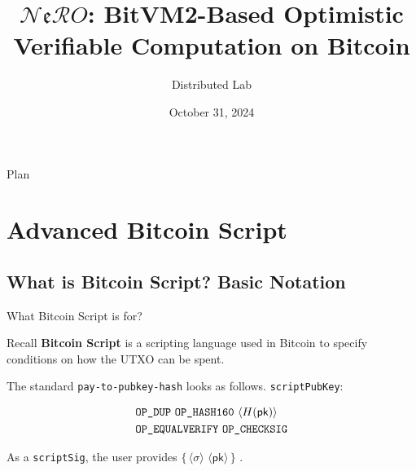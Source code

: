 \documentclass{zkdl-presentation-template}
\title[BitVM2 Made Practical]{\textbf{$\mathcal{N}\mathfrak{e}\mathcal{R}O$: BitVM2-Based Optimistic Verifiable Computation on Bitcoin}}
\author{Distributed Lab}
\date{October 31, 2024}
\newcommand{\elem}[1]{\, \langle #1 \rangle \,}
\newcommand{\opcode}[1]{\, \texttt{#1} \,}
\newcommand{\script}[1]{ $\big\{ #1 \big\}$ }
\begin{document}
 
	\begin{frame}{Plan}
        \tableofcontents
    \end{frame}

	\section{Advanced Bitcoin Script}

    \subsection{What is Bitcoin Script? Basic Notation}

    \begin{frame}{What Bitcoin Script is for?}
        \begin{block}{Recall}
            \textbf{Bitcoin Script} is a scripting language used in Bitcoin to specify conditions on how the UTXO can be spent.\pause
        \end{block}

        \begin{example}
            The standard \texttt{pay-to-pubkey-hash} looks as follows. \texttt{scriptPubKey}:
              \begin{empheqboxed}
                \small
                \begin{align*}
                    &\opcode{\texttt{OP\_DUP}} \opcode{\texttt{OP\_HASH160}} \elem{H(\mathsf{pk})} \\ &\opcode{OP\_EQUALVERIFY} 
                    \opcode{OP\_CHECKSIG}
                \end{align*}
              \end{empheqboxed}

            \pause As a \texttt{scriptSig}, the user provides \script{\elem{\sigma} \elem{\mathsf{pk}}}.
        \end{example}
    \end{frame}
\end{document}
